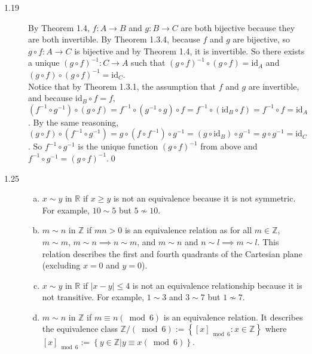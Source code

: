 \documentclass{article}
\begin{document}
\begin{description}
		\item[1.19] By Theorem 1.4, $f:A\to B$ and $g:B\to C$ are both bijective because they are both invertible. By Theorem 1.3.4, because $f$ and $g$ are bijective, so $g\circ f:A\to C$ is bijective and by Theorem 1.4, it is invertible. So there exists a unique $\left(g\circ f\right)^{-1}:C\to A$ such that $\left(g\circ f\right)^{-1}\circ\left(g\circ f\right)=\mbox{id}_A$ and $\left(g\circ f\right)\circ \left(g\circ f\right)^{-1}=\mbox{id}_C$.\\
		Notice that by Theorem 1.3.1, the assumption that $f$ and $g$ are invertible, and because $\mbox{id}_B\circ f=f$, $\left(f^{-1}\circ g^{-1}\right)\circ\left(g\circ f\right)=f^{-1}\circ\left(g^{-1}\circ g\right)\circ f=f^{-1}\circ\left(\mbox{id}_B\circ f\right)=f^{-1}\circ f=\mbox{id}_A$. By the same reasoning, $\left(g\circ f\right)\circ\left(f^{-1}\circ g^{-1}\right)=g\circ\left(f\circ f^{-1}\right)\circ g^{-1}=\left(g\circ\mbox{id}_B\right)\circ g^{-1}=g\circ g^{-1}=\mbox{id}_C$. So $f^{-1}\circ g^{-1}$ is the unique function $\left(g\circ f\right)^{-1}$ from above and $f^{-1}\circ g^{-1}=\left(g\circ f\right)^{-1}$.\qed
		
		\item[1.25]
			\begin{enumerate}[(a)]
				\item $x\sim y$ in $\mathbb{R}$ if $x\geq y$ is not an equivalence because it is not symmetric. For example, $10\sim5$ but $5\not\sim10$.
				\item $m\sim n$ in $\mathbb{Z}$ if $mn>0$ is an equivalence relation as for all $m\in\mathbb{Z}$, $m\sim m$, $m\sim n\implies n\sim m$, and $m\sim n$ and $n\sim l\implies m\sim l$. This relation describes the first and fourth quadrants of the Cartesian plane (excluding $x=0$ and $y=0$). 
				\item $x\sim y$ in $\mathbb{R}$ if $|x-y|\leq4$ is not an equivalence relationship because it is not transitive. For example, $1\sim3$ and $3\sim 7$ but $1\not\sim7$.  
				\item $m\sim n$ in $\mathbb{Z}$ if $m\equiv n \left(\bmod6\right)$ is an equivalence relation. It describes the equivalence class $\mathbb{Z}/\left(\bmod6\right):=\left\{\left[x\right]_{\bmod6}:x\in\mathbb{Z}\right\}$ where $\left[x\right]_{\bmod 6}:=\left\{y\in\mathbb{Z}|y\equiv x\left(\bmod6\right)\right\}$. 
			\end{enumerate}
		

\end{description}
\end{document}
